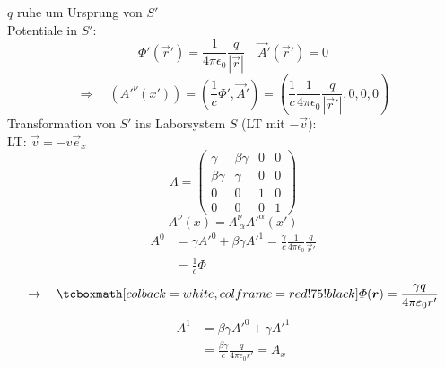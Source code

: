 \begin{enumerate}[1)]
\begin{center}
	\end{center}
	$ q $ ruhe um Ursprung von $ S' $\\[5pt]
	Potentiale in $ S' $:
	\begin{equation*}
	\Phi'(\vec{r}') = \frac{1}{4 \pi \epsilon_0} \frac{q}{|\vec{r}|} \quad \vec{A}'(\vec{r}') = 0
	\end{equation*}
	\begin{equation*}
	\Rightarrow \quad \left(A'^{\nu} (x')\right) = \left(\frac{1}{c} \Phi', \vec{A}'\right) = \left(\frac{1}{c} \frac{1}{4 \pi \epsilon_0} \frac{q}{|\vec{r}'|}, 0, 0, 0\right)
	\end{equation*}
	Transformation von $ S' $  ins Laborsystem $ S $ (LT mit $ - \vec{v} $):\\[5pt]
	LT: $ \vec{v} = -v \vec{e}_x $
	\begin{equation*}
	\Lambda = \begin{pmatrix}
	\gamma & \beta \gamma & 0 & 0 \\
	\beta \gamma & \gamma & 0 & 0 \\
	0 & 0 & 1 & 0 \\
	0 & 0 & 0 & 1
	\end{pmatrix}
	\end{equation*}
	\begin{equation*}
	A^{\nu} (x) = \Lambda^{\nu}_{\ \alpha} A'^{\alpha} (x')
	\end{equation*}
	\begin{align*}
	A^{0} &= \gamma A'^{0} + \beta \gamma A'^{1} = \frac{\gamma}{c} \frac{1}{4 \pi \epsilon_0} \frac{q}{\vec{r}'}\\
	&= \frac{1}{c} \Phi
	\end{align*}
	\begin{equation*}
	\rightarrow \quad \rmbox{\Phi (\vec{r}) = \frac{\gamma q}{4 \pi \epsilon_0 r'}}
	\end{equation*}
	\begin{align*}
	A^{1} &= \beta \gamma A'^{0} + \gamma A'^{1}\\
	&= \frac{\beta \gamma}{c} \frac{q}{4 \pi \epsilon_0 r'} = A_x\\

\end{align*}
\end{enumerate}
